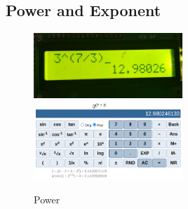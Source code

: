 \documentclass[a4paper,12pt]{article}
\begin{document}
\subsection{Power and Exponent}
\begin{figure}[H]
    \centering
    {\includegraphics[width=0.5\textwidth]{figs/pow1.jpeg}}
     \hfill
    {\includegraphics[width=0.5\textwidth]{figs/POW_VERIFY.png}}
    \caption{Power}
\end{figure}
\end{document}
